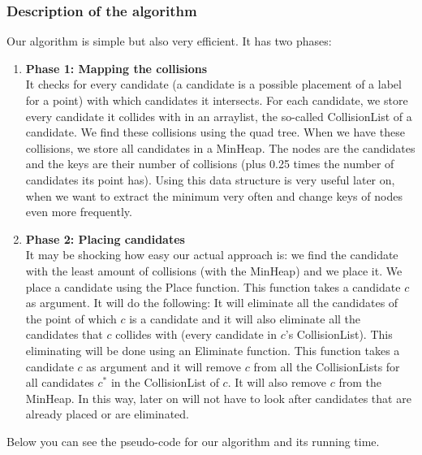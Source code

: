 \documentclass[crop=false,a4paper,oneside,11pt]{article}
\begin{document}
\subsubsection{Description of the algorithm}
Our algorithm is simple but also very efficient. It has two phases:
\begin{enumerate}
\item \textbf{Phase 1: Mapping the collisions}\\
It checks for every candidate (a candidate is a possible placement of a label for a point) with which candidates it intersects. For each candidate, we store every candidate it collides with in an arraylist, the so-called CollisionList of a candidate. We find these collisions using the quad tree. When we have these collisions, we store all candidates in a MinHeap. The nodes are the candidates and the keys are their number of collisions (plus 0.25 times the number of candidates its point has). Using this data structure is very useful later on, when we want to extract the minimum very often and change keys of nodes even more frequently.
\item \textbf{Phase 2: Placing candidates}\\
It may be shocking how easy our actual approach is: we find the candidate with the least amount of collisions (with the MinHeap) and we place it. We place a candidate using the Place function. This function takes a candidate $c$ as argument. It will do the following: It will eliminate all the candidates of the point of which $c$ is a candidate and it will also eliminate all the candidates that $c$ collides with (every candidate in $c$'s CollisionList). This eliminating will be done using an Eliminate function. This function takes a candidate $c$ as argument and it will remove $c$ from all the CollisionLists for all candidates $c^*$ in the CollisionList of $c$. It will also remove $c$ from the MinHeap. In this way, later on will not have to look after candidates that are already placed or are eliminated. 
\end{enumerate}
Below you can see the pseudo-code for our algorithm and its running time.
\end{document}
